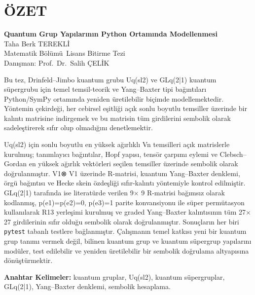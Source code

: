 \documentclass[12pt,a4paper]{report}
\numberwithin{equation}{chapter}
\theoremstyle{plain}
\theoremstyle{definition}
\newcommand{\TezBaslik}{Quantum Grup Yapılarının Python Ortamında Modellenmesi}
\newcommand{\Ogrenci}{Taha Berk TEREKLİ}
\newcommand{\Danisman}{Prof.\ Dr.\ Salih ÇELİK}
\newcommand{\Bolum}{Matematik Bölümü}
\begin{document}
\clearpage

\listoffigures
{}
\clearpage

\listoftables
{}
\clearpage

\chapter{ÖZET}
\begin{center}
{\bfseries \TezBaslik}\\[4pt]
\Ogrenci\\[8pt]
\Bolum\ Lisans Bitirme Tezi\\[6pt]
Danışman: \Danisman\\[10pt]
\end{center}

Bu tez, Drinfeld--Jimbo kuantum grubu Uq(sl2) ve GLq(2|1) kuantum süpergrubu için
temel temsil-teorik ve Yang--Baxter tipi bağıntıları Python/SymPy ortamında yeniden
üretilebilir biçimde modellemektedir. Yöntemin çekirdeği, her cebirsel eşitliği açık
sonlu boyutlu temsiller üzerinde bir kalıntı matrisine indirgemek ve bu matrisin tüm
girdilerini sembolik olarak sadeleştirerek sıfır olup olmadığını denetlemektir.

Uq(sl2) için sonlu boyutlu en yüksek ağırlıklı Vn temsilleri açık matrislerle
kurulmuş; tanımlayıcı bağıntılar, Hopf yapısı, tensör çarpımı eylemi ve
Clebsch--Gordan en yüksek ağırlık vektörleri seçilen temsiller üzerinde sembolik
olarak doğrulanmıştır. V1⊗ V1 üzerinde R-matrisi, kuantum Yang--Baxter
denklemi, örgü bağıntısı ve Hecke skein özdeşliği sıfır-kalıntı yöntemiyle kontrol
edilmiştir. GLq(2|1) tarafında ise literatürde verilen 9× 9 R-matrisi
bağımsız olarak kodlanmış, p(e1)=p(e2)=0, p(e3)=1 parite konvansiyonu ile
süper permütasyon kullanılarak R13 yerleşimi kurulmuş ve graded Yang--Baxter
kalıntısının tüm 27× 27 girdilerinin sıfır olduğu sembolik olarak
doğrulanmıştır. Sonuçların her biri \texttt{pytest} tabanlı testlere bağlanmıştır.
Çalışmanın temel katkısı yeni bir kuantum grup tanımı vermek değil, bilinen kuantum
grup ve kuantum süpergrup yapılarını modüler, test edilebilir ve yeniden
üretilebilir bir sembolik doğrulama altyapısına dönüştürmektir.

\vspace{0.6cm}
\noindent\textbf{Anahtar Kelimeler:} kuantum gruplar, Uq(sl2),
kuantum süpergruplar, GLq(2|1), Yang--Baxter denklemi, sembolik hesaplama.
\clearpage
\end{document}
